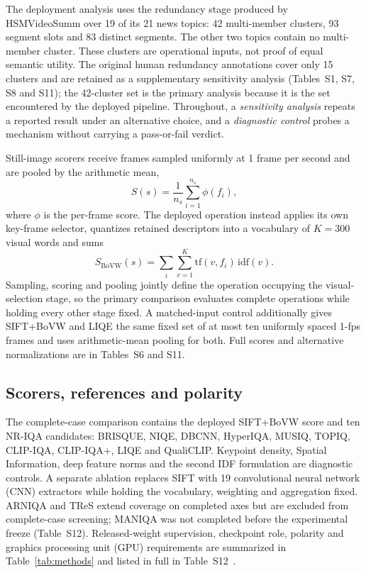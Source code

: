 The deployment analysis uses the redundancy stage produced by HSMVideoSumm over
19 of its 21 news topics: 42 multi-member clusters, 93 segment slots and 83
distinct segments. The other two topics contain no multi-member cluster. These
clusters are operational inputs, not proof of equal semantic utility. The
original human redundancy annotations cover only 15 clusters and are retained
as a supplementary sensitivity analysis (Tables~S1, S7, S8 and S11); the 42-cluster set is the primary analysis because it is the set encountered by the
deployed pipeline. Throughout, a \emph{sensitivity analysis} repeats a reported result
under an alternative choice, and a \emph{diagnostic control} probes a mechanism without
carrying a pass-or-fail verdict.

Still-image scorers receive frames sampled uniformly at 1 frame per second and
are pooled by the arithmetic mean,
\begin{equation}
S(s)=\frac{1}{n_s}\sum_{i=1}^{n_s}\phi(f_i),
\label{eq:meanpool}
\end{equation}
where $\phi$ is the per-frame score. The deployed operation instead applies its
own key-frame selector, quantizes retained descriptors into a vocabulary of
$K=300$ visual words and sums
\begin{equation}
S_{\mathrm{BoVW}}(s)=\sum_i\sum_{v=1}^{K}
\mathrm{tf}(v,f_i)\,\mathrm{idf}(v).
\label{eq:bovw}
\end{equation}
Sampling, scoring and pooling jointly define the operation occupying the
visual-selection stage, so the primary comparison evaluates complete operations
while holding every other stage fixed. A matched-input control additionally gives
SIFT+BoVW and LIQE the same fixed set of at most ten uniformly spaced 1-fps
frames and uses arithmetic-mean pooling for both. Full scores and alternative normalizations are in Tables~S6 and S11.

\subsection{Scorers, references and polarity}\label{sec:methods}

The complete-case comparison contains the deployed SIFT+BoVW score and ten
NR-IQA candidates: BRISQUE, NIQE, DBCNN, HyperIQA, MUSIQ, TOPIQ, CLIP-IQA,
CLIP-IQA$+$, LIQE and QualiCLIP. Keypoint density, Spatial Information, deep
feature norms and the second IDF formulation are diagnostic controls. A separate ablation replaces SIFT with 19 convolutional neural network (CNN) extractors while holding
the vocabulary, weighting and aggregation fixed. ARNIQA and TReS extend
coverage on completed axes but are excluded from complete-case screening;
MANIQA was not completed before the experimental freeze (Table~S12).
Released-weight supervision, checkpoint role, polarity and graphics processing unit (GPU) requirements are summarized in Table~\ref{tab:methods} and
listed in full in Table~S12~\citep{agnolucci2024arniqa,golestaneh2022tres,
yang2022maniqa}.

